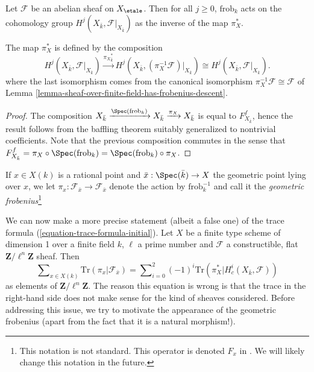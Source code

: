 \begin{theorem}
\label{theorem-geometric-arithmetic-inverse}
Let $\mathcal{F}$ be an abelian sheaf on $X_\etale$. Then for all
$j\geq 0$, $\text{frob}_k$ acts on the cohomology group $H^j(X_{\bar k},
\mathcal{F}|_{X_{\bar k}})$ as the inverse of the map $\pi_X^*$.
\end{theorem}

\noindent
The map $\pi_X^*$ is defined by the composition
$$
H^j(X_{\bar k}, \mathcal{F}|_{X_{\bar k}}) \xrightarrow{{\pi_X}_{\bar k}^*}
H^j(X_{\bar k}, (\pi_X^{-1} \mathcal{F})|_{X_{\bar k}}) \cong
H^j(X_{\bar k}, \mathcal{F}|_{X_{\bar k}}).
$$
where the last isomorphism comes from the canonical isomorphism
$\pi_X^{-1} \mathcal{F} \cong \mathcal{F}$ of
Lemma \ref{lemma-sheaf-over-finite-field-has-frobenius-descent}.

\begin{proof}
The composition $X_{\bar k} \xrightarrow{\Spec(\text{frob}_k)} X_{\bar k}
\xrightarrow{\pi_X} X_{\bar k}$ is equal to $F_{X_{\bar k}}^f$, hence the
result follows from the baffling theorem suitably generalized to nontrivial
coefficients. Note that the previous composition commutes in the sense that
$F_{X_{\bar k}}^f = \pi_X \circ \Spec(\text{frob}_k) =
\Spec(\text{frob}_k) \circ \pi_X$.
\end{proof}

\begin{definition}
\label{definition-geometric-frobenius-on-stalk}
If $x \in X(k)$ is a rational point and $\bar x : \Spec(\bar k) \to X$
the geometric point lying over $x$, we let $\pi_x : \mathcal{F}_{\bar x} \to
\mathcal{F}_{\bar x}$ denote the action by $\text{frob}_k^{-1}$ and call it the
{\it geometric frobenius}\footnote{This notation is not standard.
This operator is denoted $F_x$ in \cite{SGA4.5}. We will likely change
this notation in the future.}
\end{definition}

\noindent
We can now make a more precise statement (albeit a false one) of the trace
formula (\ref{equation-trace-formula-initial}). Let $X$ be a finite
type scheme of dimension 1
over a finite field $k$, $\ell$ a prime number and $\mathcal{F}$ a
constructible, flat $\mathbf{Z}/\ell^n\mathbf{Z}$ sheaf. Then
\begin{equation}
\label{equation-trace-formula-second}
\sum\nolimits_{x \in X(k)}
\text{Tr}(\pi_x | \mathcal{F}_{\bar x})
=
\sum\nolimits_{i = 0}^2
(-1)^i \text{Tr}(\pi_X^* | H^i_c(X_{\bar k}, \mathcal{F}))
\end{equation}
as elements of $\mathbf{Z}/\ell^n\mathbf{Z}$. The reason this equation is wrong
is that the trace in the right-hand side does not make sense for the kind of
sheaves considered. Before addressing this issue, we try to motivate the
appearance of the geometric frobenius (apart from the fact that it is a natural
morphism!).

